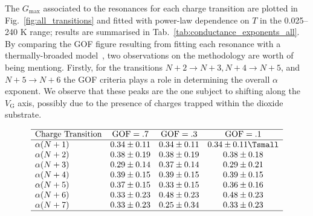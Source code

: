 The $G_\text{max}$ associated to the resonances for each charge transition are plotted in Fig.~\ref{fig:all_transitions} and fitted with power-law dependence on $T$ in the 0.025--240 K range; results are summarised in Tab.~\ref{tab:conductance_exponents_all}. By comparing the \gls{GOF} figure resulting from fitting each resonance with a thermally-broaded model~\cite{postma2001carbon}, two observations on the methodology are worth of being mentiong. Firstly, for the transitions $N+2\rightarrow N+3, N+4\rightarrow N+5$, and $N+5\rightarrow N+6$ the \gls{GOF} criteria plays a role in determining the overall $\alpha$ exponent. We observe that these peaks are the one subject to shifting along the $V_\textrm{G}$ axis, possibly due to the presence of charges trapped within the dioxide substrate.

\begin{table}
  \caption{\label{tab:conductance_exponents_all}
    Power-law exponents conductance $G^*$ over a wide range of temperatures. Errors to $\alpha$ have been calculated by evaluating the percent point function (ppf) of a two-sided Students t-distribution.}
  \[
    \begin{array}{lcccc}
      \hline \text{Charge Transition} & \text{GOF} = .7 & \text{GOF} = .3 & \text{GOF} = .1       \\
      \hline
      \alpha(N+1)                     & 0.34 \pm 0.11   & 0.34 \pm 0.11   & 0.34 \pm 0.11 \Tsmall \\
      \alpha(N+2)                     & 0.38 \pm 0.19   & 0.38 \pm 0.19   & 0.38 \pm 0.18         \\
      \alpha(N+3)                     & 0.29 \pm 0.14   & 0.37 \pm 0.14   & 0.29 \pm 0.21         \\
      \alpha(N+4)                     & 0.39 \pm 0.15   & 0.39 \pm 0.15   & 0.39 \pm 0.15         \\
      \alpha(N+5)                     & 0.37 \pm 0.15   & 0.33 \pm 0.15   & 0.36 \pm 0.16         \\
      \alpha(N+6)                     & 0.33 \pm 0.23   & 0.48 \pm 0.23   & 0.48 \pm 0.23         \\
      \alpha(N+7)                     & 0.33 \pm 0.23   & 0.25 \pm 0.34   & 0.33 \pm 0.23         \\
      \hline
    \end{array}
  \]
\end{table}

